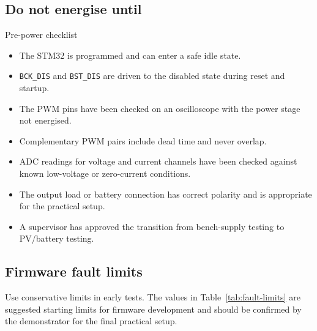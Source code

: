 \documentclass[11pt,a4paper]{article}
\newcommand{\code}[1]{\texttt{#1}}
\begin{document}
\subsection{Do not energise until}

\begin{warnbox}{Pre-power checklist}
\begin{itemize}
  \item The STM32 is programmed and can enter a safe idle state.
  \item \code{BCK\_DIS} and \code{BST\_DIS} are driven to the disabled state during reset and startup.
  \item The PWM pins have been checked on an oscilloscope with the power stage not energised.
  \item Complementary PWM pairs include dead time and never overlap.
  \item ADC readings for voltage and current channels have been checked against known low-voltage or zero-current conditions.
  \item The output load or battery connection has correct polarity and is appropriate for the practical setup.
  \item A supervisor has approved the transition from bench-supply testing to PV/battery testing.
\end{itemize}
\end{warnbox}

\subsection{Firmware fault limits}

Use conservative limits in early tests. The values in Table~\ref{tab:fault-limits} are suggested starting limits for firmware development and should be confirmed by the demonstrator for the final practical setup.
\end{document}
